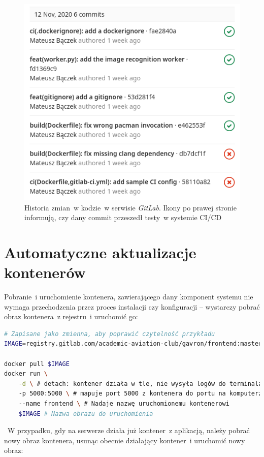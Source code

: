 \begin{figure}[H]
  \centering
  \includegraphics[width=.7\linewidth]{rys04/gitlab_ci_commit_status.png}
  \caption{ Historia zmian~w kodzie~w serwisie \textit{GitLab}.
  Ikony po prawej stronie informują, czy dany commit przeszedł testy~w systemie CI/CD }
	\label{gitlab_ci_history}
\end{figure}

\section{Automatyczne aktualizacje kontenerów} \label{ouroboros}

Pobranie~i uruchomienie kontenera, zawierającego dany komponent systemu
nie wymaga przechodzenia przez proces instalacji czy konfiguracji -- wystarczy
pobrać obraz kontenera~z rejestru~i uruchomić go:

\begin{lstlisting}[language=bash, label=list:docker_clone_run_example,caption={Pobranie~i uruchomienie obrazu dockera, zawierającego aplikację}, basicstyle=\footnotesize\ttfamily]
# Zapisane jako zmienna, aby poprawić czytelność przykładu 
IMAGE=registry.gitlab.com/academic-aviation-club/gavron/frontend:master

docker pull $IMAGE
docker run \
    -d \ # detach: kontener działa w tle, nie wysyła logów do terminala
    -p 5000:5000 \ # mapuje port 5000 z kontenera do portu na komputerze  
    --name frontend \ # Nadaje nazwę uruchomionemu kontenerowi
    $IMAGE # Nazwa obrazu do uruchomienia 
\end{lstlisting}
~W przypadku, gdy na serwerze działa już kontener~z aplikacją, należy
pobrać nowy obraz kontenera, usunąc obecnie działający kontener~i uruchomić
nowy obraz:

